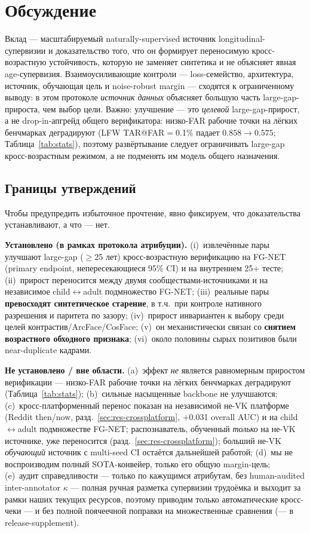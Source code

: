 \documentclass[journal]{IEEEtran}
\begin{document}
\section{Обсуждение}\label{sec:discussion}
Вклад --- масштабируемый naturally-supervised источник longitudinal-супервизии и доказательство того, что он формирует переносимую кросс-возрастную устойчивость, которую не заменяет синтетика и не объясняет явная age-супервизия. Взаимоусиливающие контроли --- loss-семейство, архитектура, источник, обучающая цель и noise-robust margin --- сходятся к ограниченному выводу: в этом протоколе \emph{источник данных} объясняет большую часть large-gap-прироста, чем выбор цели. Важно: улучшение --- это \emph{целевой} large-gap-прирост, а не drop-in-апгрейд общего верификатора: низко-FAR рабочие точки на лёгких бенчмарках деградируют (LFW TAR@FAR$=$0.1\% падает $0.858 \rightarrow 0.575$; Таблица~\ref{tab:stats}), поэтому развёртывание следует ограничивать large-gap кросс-возрастным режимом, а не подменять им модель общего назначения.

\subsection{Границы утверждений}\label{sec:scope}
Чтобы предупредить избыточное прочтение, явно фиксируем, что доказательства устанавливают, а что --- нет.

\noindent\textbf{Установлено (в рамках протокола атрибуции).} (i)~извлечённые пары улучшают large-gap ($\geq$25 лет) кросс-возрастную верификацию на FG-NET (primary endpoint, непересекающиеся 95\% CI) и на внутреннем 25+ тесте; (ii)~прирост переносится между двумя сообществами-источниками и на независимое child$\leftrightarrow$adult подмножество FG-NET; (iii)~реальные пары \textbf{превосходят синтетическое старение}, в т.ч.\ при контроле нативного разрешения и паритета по зазору; (iv)~прирост инвариантен к выбору среди целей контрастив/ArcFace/CosFace; (v)~он механистически связан со \textbf{снятием возрастного обходного признака}; (vi)~около половины сырых позитивов были near-duplicate кадрами.

\noindent\textbf{Не установлено / вне области.} (a)~эффект \emph{не} является равномерным приростом верификации --- низко-FAR рабочие точки на лёгких бенчмарках деградируют (Таблица~\ref{tab:stats}); (b)~сильные насыщенные backbone не улучшаются; (c)~кросс-платформенный перенос показан на независимой не-VK платформе (Reddit then/now, разд.~\ref{sec:res-crossplatform}, $+$0.031 overall AUC) и на child$\leftrightarrow$adult подмножестве FG-NET; распознаватель, обученный \emph{только} на не-VK источнике, уже переносится (разд.~\ref{sec:res-crossplatform}); больший не-VK \emph{обучающий} источник с multi-seed CI остаётся дальнейшей работой; (d)~мы не воспроизводим полный SOTA-конвейер, только его общую margin-цель; (e)~аудит справедливости --- только по кажущимся атрибутам, без human-audited inter-annotator $\kappa$ --- полная ручная разметка супервизии трудоёмка и выходит за рамки наших текущих ресурсов, поэтому приводим только автоматические кросс-чеки --- и без полной поячеечной поправки на множественные сравнения (--- в release-supplement).
\end{document}
